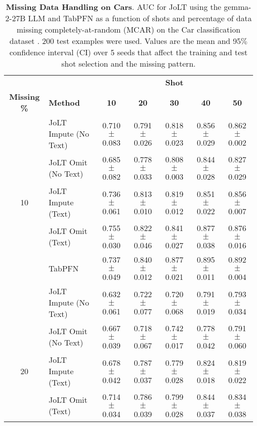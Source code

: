 \begin{table*}[htbp]
  \centering
  \caption{\textbf{Missing Data Handling on Cars}. AUC for JoLT using the gemma-2-27B LLM and TabPFN as a function of shots and percentage of data missing completely-at-random (MCAR) on the Car classification dataset \citep{car_evaluation_19}. 200 test examples were used. Values are the mean and 95$\%$ confidence interval (CI) over 5 seeds that affect the training and test shot selection and the missing pattern.}
  \label{tab:car_missing}%
  \vskip 0.1in
  \begin{small}
  \begin{sc}
  \begin{adjustbox}{max width=\textwidth}
    \begin{tabular}{clccccc}
    \toprule
          &       & \multicolumn{5}{c}{\textbf{Shot}} \\
\cmidrule{3-7}    \textbf{Missing \%} & \textbf{Method} & \textbf{10} & \textbf{20} & \textbf{30} & \textbf{40} & \textbf{50} \\
    \midrule
          & JoLT Impute (No Text) & 0.710$\pm$0.083 & 0.791$\pm$0.026 & 0.818$\pm$0.023 & 0.856$\pm$0.029 & 0.862$\pm$0.002 \\
          & JoLT Omit (No Text) & 0.685$\pm$0.082 & 0.778$\pm$0.033 & 0.808$\pm$0.003 & 0.844$\pm$0.028 & 0.827$\pm$0.029 \\
    10    & JoLT Impute (Text) & 0.736$\pm$0.061 & 0.813$\pm$0.010 & 0.819$\pm$0.012 & 0.851$\pm$0.022 & 0.856$\pm$0.007 \\
          & JoLT Omit (Text) & 0.755$\pm$0.030 & 0.822$\pm$0.046 & 0.841$\pm$0.027 & 0.877$\pm$0.038 & 0.876$\pm$0.016 \\
          & TabPFN & 0.737$\pm$0.049 & 0.840$\pm$0.012 & 0.877$\pm$0.021 & 0.895$\pm$0.011 & 0.892$\pm$0.004 \\
    \midrule
          & JoLT Impute (No Text) & 0.632$\pm$0.061 & 0.722$\pm$0.077 & 0.720$\pm$0.068 & 0.791$\pm$0.019 & 0.793$\pm$0.034 \\
          & JoLT Omit (No Text) & 0.667$\pm$0.039 & 0.718$\pm$0.067 & 0.742$\pm$0.017 & 0.778$\pm$0.042 & 0.791$\pm$0.060 \\
    20    & JoLT Impute (Text) & 0.678$\pm$0.042 & 0.787$\pm$0.037 & 0.779$\pm$0.028 & 0.824$\pm$0.018 & 0.819$\pm$0.022 \\
          & JoLT Omit (Text) & 0.714$\pm$0.034 & 0.786$\pm$0.039 & 0.799$\pm$0.028 & 0.844$\pm$0.037 & 0.834$\pm$0.038 \\

\end{tabular}
\end{adjustbox}
\end{sc}
\end{small}
\end{table*}
